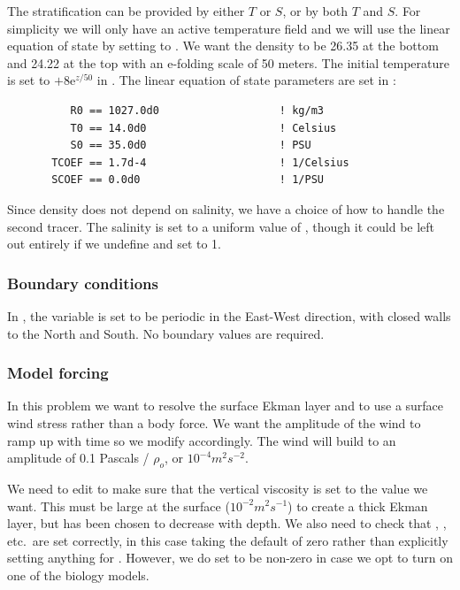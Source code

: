 The stratification can be provided by either $T$ or $S$, or by both
$T$ and $S$.  For
simplicity we will only have an active temperature field and we will
use the linear equation of state by setting  to
. We want the density to be 26.35 at
the bottom and 24.22 at the top with an e-folding scale of 50 meters.
The initial temperature is set to $ + 8\mbox{e}^{z/50}$ in
.  The linear equation of state parameters are set
in :
\begin{verbatim}
          R0 == 1027.0d0                   ! kg/m3
          T0 == 14.0d0                     ! Celsius
          S0 == 35.0d0                     ! PSU
       TCOEF == 1.7d-4                     ! 1/Celsius
       SCOEF == 0.0d0                      ! 1/PSU
\end{verbatim}

Since density does not depend on salinity, we have a choice of how to
handle the second tracer. The salinity is set to a uniform value
of , though it could be left out entirely if we undefine
 and set  to 1.

\subsubsection{Boundary conditions}
In , the variable  is set to be
periodic in the East-West direction, with closed walls to the North
and South. No boundary values are required.

\subsubsection{Model forcing}
In this problem we want to resolve the
surface Ekman layer and to use a surface wind stress rather than a body
force.  We want the amplitude of the wind to ramp up with time so we
modify  accordingly.
The wind will build to an amplitude of 0.1 Pascals / $\rho_o$,
or $10^{-4} m^2 s^{-2}$.

We need to edit  to make sure that the
vertical viscosity  is set to the value we want.  This
must be large at the surface ($10^{-2} m^2 s^{-1}$) to create a thick
Ekman layer, but has been chosen to decrease with depth.  We also need
to check that , , etc.\ are
set correctly, in this case taking the default of zero rather than
explicitly setting anything for . However, we do set
 to be non-zero in case we opt to turn on one of
the biology models.

